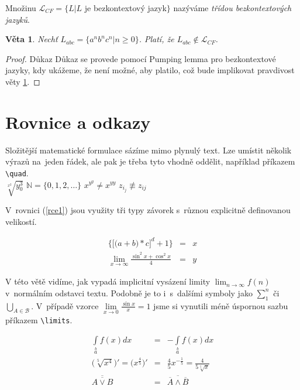 \documentclass[a4paper, 11pt]{article}
\begin{document}
\begin{definition}
Množinu $\mathcal{L}_{CF} = \{L | L$ je bezkontextový jazyk$\}$ nazýváme \emph{třídou bezkontextových jazyků}.
\end{definition}

\theoremstyle{definition}
\newtheorem{lemma}{Věta}

\begin{lemma} \item \label{sentence1}
\emph{Nechť $L_{abc} = \{a^nb^nc^n|n \geq 0 \}$. Platí, že $L_{abc} \not\in \mathcal{L}_{CF}$.}
\end{lemma}

\begin{proof}{Důkaz}
Důkaz se provede pomocí Pumping lemma pro bezkontextové jazyky, kdy ukážeme, že není možné, aby platilo, což bude implikovat pravdivost věty \ref{sentence1}.
\end{proof}

\section{Rovnice a odkazy}
Složitější matematické formulace sázíme mimo plynulý text. Lze umístit několik výrazů na~jeden řádek, ale pak je třeba tyto vhodně oddělit, například příkazem \verb|\quad|. \\

$\sqrt[x^2]{y_0^3}$ \quad $\mathbb{N} = \{0,1,2,\ldots\}$ \quad $x^{y^y} \not = x^{yy} $ \quad $z_{i_j} \not\equiv z_{ij}$\\

\par V~rovnici (\ref{rce1}) jsou využity tři typy závorek s~různou explicitně definovanou velikostí.

\begin{eqnarray}
\label{rce1}\bigg\{\Big[\big(a + b\big) * c\Big]^d + 1\bigg\} &=& x \\ 
\nonumber \lim_{x \to \infty} \frac{\sin^2x + \cos^2x}{4} &=& y
\end{eqnarray}

V této větě vidíme, jak vypadá implicitní vysázení limity $\lim_{n \to \infty}f(n)$ v~normálním odstavci textu. Podobně je to i~s~dalšími symboly jako $\sum_1^n$ či $\bigcup_{A \in \mathcal{B}}$. V~případě vzorce $\lim\limits_{x \to 0} \frac{\sin x}{x}= 1$ jsme si vynutili méně úspornou sazbu příkazem \verb|\limits|.


\begin{eqnarray}
\label{rce2}
\int\limits_{a}\limits^{b} f(x) dx &=& - \int\limits_{a}\limits^b f(x) dx\\
\label{rce3}
\bigg( \sqrt[5]{x^4}\bigg)' = \bigg( x^{\frac{4}{5}} \bigg)' &=& \frac{4}{5} x^{-\frac{1}{5}} = \frac{4}{5\sqrt[5] x}\\
\label{rce4}
\overline{\overline{A \vee B}} &=& \overline{\overline{A} \wedge \overline{B}}
\end{eqnarray}
\end{document}
